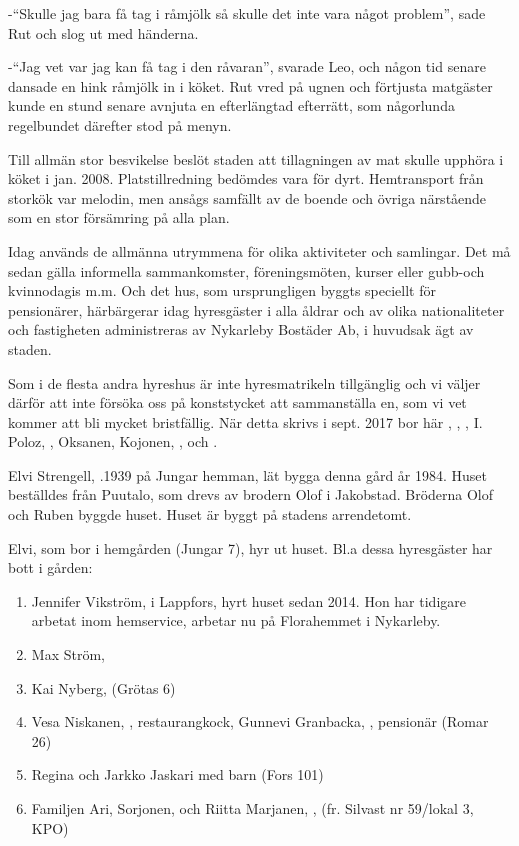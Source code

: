 -``Skulle jag bara få tag i råmjölk så skulle det inte vara något problem'', sade Rut och slog ut med händerna.

-``Jag vet var jag kan få tag i den råvaran'', svarade Leo, och någon tid senare dansade en hink råmjölk in i köket. Rut vred på ugnen och förtjusta matgäster kunde en stund senare avnjuta en efterlängtad efterrätt, som
någorlunda regelbundet därefter stod på menyn.

Till allmän stor besvikelse beslöt staden att tillagningen av mat skulle upphöra i köket i jan. 2008. Platstillredning bedömdes vara för dyrt. Hemtransport från storkök var melodin, men ansågs samfällt av de boende och övriga närstående som en stor försämring på alla plan.

Idag används de allmänna utrymmena för olika aktiviteter och samlingar. Det må sedan gälla informella sammankomster, föreningsmöten, kurser eller gubb-och kvinnodagis m.m. Och det hus, som ursprungligen byggts speciellt för pensionärer, härbärgerar idag hyresgäster i alla åldrar och av olika nationaliteter och fastigheten administreras av Nykarleby Bostäder Ab, i huvudsak ägt av staden.

Som i de flesta andra hyreshus är inte hyresmatrikeln tillgänglig och vi väljer därför att inte försöka oss på konststycket att sammanställa en, som vi vet kommer att bli mycket bristfällig. När detta skrivs i sept.
2017 bor här , , , I. Poloz, , Oksanen, Kojonen, ,  och .






Elvi Strengell, .1939 på Jungar hemman, lät bygga denna gård år 1984. Huset beställdes från Puutalo, som drevs av brodern Olof i Jakobstad. Bröderna Olof och Ruben byggde huset. Huset är byggt på stadens arrendetomt.

Elvi, som bor i hemgården (Jungar 7), hyr ut huset. Bl.a dessa hyresgäster har bott i gården:
\begin{enumerate}
  \item Jennifer Vikström,  i Lappfors, hyrt huset sedan 2014. Hon har tidigare arbetat inom hemservice, arbetar nu på Florahemmet i Nykarleby.
  \item Max Ström, 
  \item Kai Nyberg,  (Grötas 6)
  \item Vesa Niskanen, , restaurangkock, Gunnevi Granbacka, , pensionär (Romar 26)
  \item Regina  och Jarkko Jaskari med barn (Fors 101)
  \item Familjen Ari, Sorjonen,  och Riitta Marjanen, , (fr. Silvast nr 59/lokal 3, KPO)
\end{enumerate}



